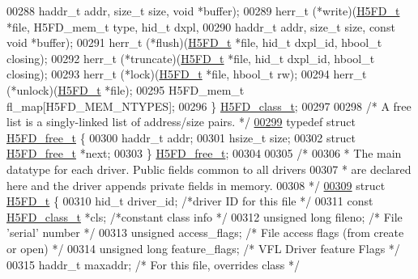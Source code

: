 \begin{DoxyCode}
00288                     haddr\_t addr, \textcolor{keywordtype}{size\_t} size, \textcolor{keywordtype}{void} *buffer);
00289     herr\_t  (*write)(\hyperlink{struct_h5_f_d__t}{H5FD\_t} *file, H5FD\_mem\_t type, hid\_t dxpl,
00290                      haddr\_t addr, \textcolor{keywordtype}{size\_t} size, \textcolor{keyword}{const} \textcolor{keywordtype}{void} *buffer);
00291     herr\_t  (*flush)(\hyperlink{struct_h5_f_d__t}{H5FD\_t} *file, hid\_t dxpl\_id, hbool\_t closing);
00292     herr\_t  (*truncate)(\hyperlink{struct_h5_f_d__t}{H5FD\_t} *file, hid\_t dxpl\_id, hbool\_t closing);
00293     herr\_t  (*lock)(\hyperlink{struct_h5_f_d__t}{H5FD\_t} *file, hbool\_t rw);
00294     herr\_t  (*unlock)(\hyperlink{struct_h5_f_d__t}{H5FD\_t} *file);
00295     H5FD\_mem\_t fl\_map[H5FD\_MEM\_NTYPES];
00296 \} \hyperlink{struct_h5_f_d__class__t}{H5FD\_class\_t};
00297 
00298 \textcolor{comment}{/* A free list is a singly-linked list of address/size pairs. */}
\hyperlink{struct_h5_f_d__free__t}{00299} \textcolor{keyword}{typedef} \textcolor{keyword}{struct }\hyperlink{struct_h5_f_d__free__t}{H5FD\_free\_t} \{
00300     haddr\_t     addr;
00301     hsize\_t     size;
00302     \textcolor{keyword}{struct }\hyperlink{struct_h5_f_d__free__t}{H5FD\_free\_t}   *next;
00303 \} \hyperlink{struct_h5_f_d__free__t}{H5FD\_free\_t};
00304 
00305 \textcolor{comment}{/*}
00306 \textcolor{comment}{ * The main datatype for each driver. Public fields common to all drivers}
00307 \textcolor{comment}{ * are declared here and the driver appends private fields in memory.}
00308 \textcolor{comment}{ */}
\hyperlink{struct_h5_f_d__t}{00309} \textcolor{keyword}{struct }\hyperlink{struct_h5_f_d__t}{H5FD\_t} \{
00310     hid\_t               driver\_id;      \textcolor{comment}{/*driver ID for this file   */}
00311     \textcolor{keyword}{const} \hyperlink{struct_h5_f_d__class__t}{H5FD\_class\_t} *cls;            \textcolor{comment}{/*constant class info       */}
00312     \textcolor{keywordtype}{unsigned} \textcolor{keywordtype}{long}       fileno;         \textcolor{comment}{/* File 'serial' number     */}
00313     \textcolor{keywordtype}{unsigned}            access\_flags;   \textcolor{comment}{/* File access flags (from create or open) */}
00314     \textcolor{keywordtype}{unsigned} \textcolor{keywordtype}{long}       feature\_flags;  \textcolor{comment}{/* VFL Driver feature Flags */}
00315     haddr\_t             maxaddr;        \textcolor{comment}{/* For this file, overrides class */}

\end{DoxyCode}
